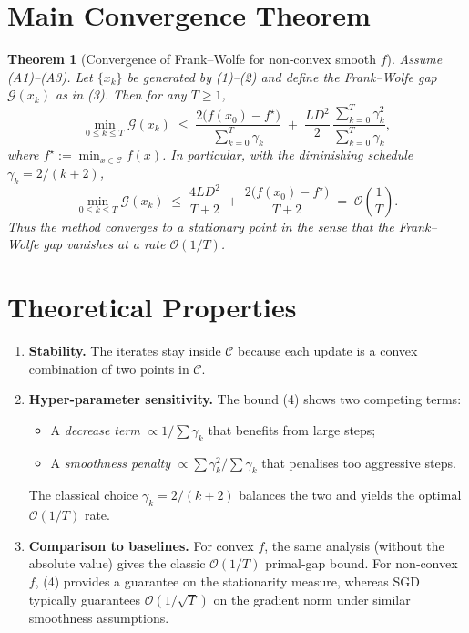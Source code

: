 \documentclass{article}
\newtheorem{theorem}{Theorem}
\begin{document}
\section*{Main Convergence Theorem}
\begin{theorem}[Convergence of Frank–Wolfe for non‑convex smooth $f$]\label{thm:main}
Assume (A1)–(A3).  Let $\{x_k\}$ be generated by (1)–(2) and define the Frank–Wolfe gap $\mathcal G(x_k)$ as in (3).  Then for any $T\ge 1$,
\[
\min_{0\le k\le T}\mathcal G(x_k)
\;\le\;
\frac{2\bigl(f(x_0)-f^\star\bigr)}{\sum_{k=0}^{T}\gamma_k}
\;+\;
\frac{L D^{2}}{2}\,\frac{\sum_{k=0}^{T}\gamma_k^{2}}{\sum_{k=0}^{T}\gamma_k},
\tag{4}
\]
where $f^\star:=\min_{x\in\mathcal C}f(x)$.  
In particular, with the diminishing schedule $\gamma_k=2/(k+2)$,
\[
\min_{0\le k\le T}\mathcal G(x_k)
\;\le\;
\frac{4L D^{2}}{T+2}
\;+\;
\frac{2\bigl(f(x_0)-f^\star\bigr)}{T+2}
\;=\; \mathcal O\!\left(\frac{1}{T}\right).
\tag{5}
\]
Thus the method converges to a stationary point in the sense that the Frank–Wolfe gap vanishes at a rate $\mathcal O(1/T)$.
\end{theorem}

\section*{Theoretical Properties}
\begin{enumerate}[label=\arabic*.]
\item \textbf{Stability.}  The iterates stay inside $\mathcal C$ because each update is a convex combination of two points in $\mathcal C$.
\item \textbf{Hyper‑parameter sensitivity.}  The bound (4) shows two competing terms:
    \begin{itemize}
        \item A \emph{decrease term} $\propto 1/\sum\gamma_k$ that benefits from large steps;
        \item A \emph{smoothness penalty} $\propto \sum\gamma_k^{2}/\sum\gamma_k$ that penalises too aggressive steps.
    \end{itemize}
    The classical choice $\gamma_k=2/(k+2)$ balances the two and yields the optimal $\mathcal O(1/T)$ rate.
\item \textbf{Comparison to baselines.}  For convex $f$, the same analysis (without the absolute value) gives the classic $ \mathcal O(1/T)$ primal‑gap bound.  For non‑convex $f$, (4) provides a guarantee on the stationarity measure, whereas SGD typically guarantees $\mathcal O(1/\sqrt{T})$ on the gradient norm under similar smoothness assumptions.
\end{enumerate}
\end{document}
